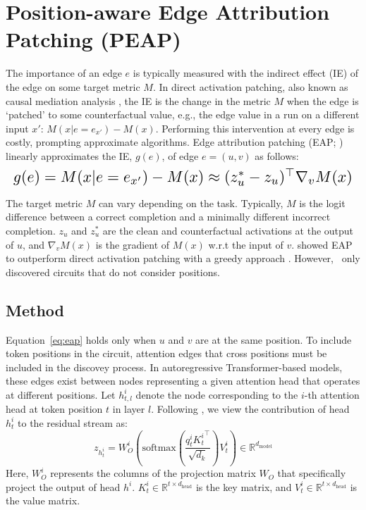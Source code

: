 \section{Position-aware Edge Attribution Patching (PEAP)} \label{sec:full_circ_discovery}

The importance of an edge $e$ is typically measured with the indirect effect (IE) of the edge on some target metric $M$.
In direct activation patching, also known as causal mediation analysis \cite{Pearl:2001:DIE:2074022.2074073,vig-2020-gender, mueller2024quest}, 
the IE is the change in the metric $M$ when the edge is `patched' to some counterfactual value, e.g., the edge value in a run on a different input $x'$:  $M(x|e=e_{x'}) - M(x)$. Performing this intervention at every edge is costly, prompting approximate algorithms. 
Edge attribution patching (EAP; \citealp{syed2023attribution})
linearly approximates the IE, $g(e)$, of edge $e=(u, v)$ as follows:
\begin{equation}
    \resizebox{\linewidth}{!}{$g(e) = M(x|e=e_{x'}) - M(x) \approx (z^*_u - z_u)^\top \nabla_v M(x) \label{eq:eap}$}
\end{equation}

The target metric $M$ can vary depending on the task.
Typically, $M$ is the logit difference between a correct completion and a minimally different incorrect completion.
$z_{u}$ and $z^*_{u}$ are the clean and counterfactual activations at the output of $u$, and $\nabla_v M(x)$ is the gradient of $M(x)$ w.r.t the input of $v$. 
\citet{syed2023attribution} showed EAP  to outperform direct activation patching with a greedy approach \citep{conmytowards}.
However, 
\citeauthor{syed2023attribution}\ only discovered circuits that do not consider positions. 

\subsection{Method} Equation~\ref{eq:eap} holds only when $u$ and $v$ are at the same position.
To include token positions in the circuit, attention edges that cross positions must be included in the discovey process. 
In autoregressive Transformer-based models,
these edges exist between nodes representing a given attention head that operates at different positions. 
Let $h^i_{t,l}$ denote the node corresponding to the $i$-th attention head at token position $t$ in layer $l$. 
Following \citet{olah2021framework}, we view the contribution of head $h^i_{t}$ to the residual stream %
as:
%
\begin{equation}
z_{h^i_{t}} = W^{i}_{O} (\text{softmax} ( \frac{q^i_{t}{K^i_{t}}^\top}{\sqrt{d_k}}  ) V^i_{t} ) \in \mathbb{R}^{d_{\text{model}}}
\label{eq:attn}
\end{equation}
Here, \( W_{O}^{i} \) represents the columns of the projection matrix \( W_{O} \) that specifically project the output of head \( h^i \). \( K^i_{t} \in \mathbb{R}^{t \times d_{\text{head}}} \) is the key matrix, and \( V^i_{t} \in \mathbb{R}^{t \times d_{\text{head}}} \) is the value matrix.

